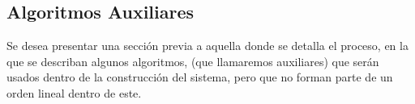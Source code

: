 \documentclass[11pt]{article}
\numberwithin{equation}{section} %
\numberwithin{figure}{section} %
\numberwithin{table}{section} %
\begin{document}
	\subsection{Algoritmos Auxiliares}
	\label{AA}
		Se desea presentar una sección previa a aquella donde se detalla el proceso, en la que se describan algunos algoritmos, (que llamaremos auxiliares) que serán usados dentro de la construcción del sistema, pero que no forman parte de un orden lineal dentro de este.

\end{document}
